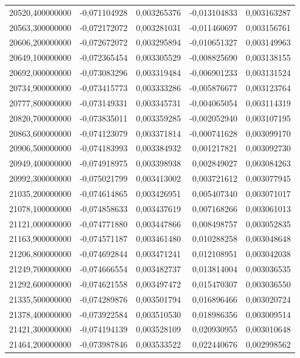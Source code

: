 \begin{longtable}{rrrrr}
20520,400000000 & -0,071104928 & 0,003265376 & -0,013104833 & 0,003163287\\
20563,300000000 & -0,072172072 & 0,003281031 & -0,011460697 & 0,003156761\\
20606,200000000 & -0,072672072 & 0,003295894 & -0,010651327 & 0,003149963\\
20649,100000000 & -0,072365454 & 0,003305529 & -0,008825690 & 0,003138155\\
20692,000000000 & -0,073083296 & 0,003319484 & -0,006901233 & 0,003131524\\
20734,900000000 & -0,073415773 & 0,003333286 & -0,005876677 & 0,003123764\\
20777,800000000 & -0,073149331 & 0,003345731 & -0,004065054 & 0,003114319\\
20820,700000000 & -0,073835011 & 0,003359285 & -0,002052940 & 0,003107195\\
20863,600000000 & -0,074123079 & 0,003371814 & -0,000741628 & 0,003099170\\
20906,500000000 & -0,074183993 & 0,003384932 & 0,001217821 & 0,003092730\\
20949,400000000 & -0,074918975 & 0,003398938 & 0,002849027 & 0,003084263\\
20992,300000000 & -0,075021799 & 0,003413002 & 0,003721612 & 0,003077945\\
21035,200000000 & -0,074614865 & 0,003426951 & 0,005407340 & 0,003071017\\
21078,100000000 & -0,074858633 & 0,003437619 & 0,007168266 & 0,003061013\\
21121,000000000 & -0,074771880 & 0,003447866 & 0,008498757 & 0,003052835\\
21163,900000000 & -0,074571187 & 0,003461480 & 0,010288258 & 0,003048648\\
21206,800000000 & -0,074692844 & 0,003471241 & 0,012108951 & 0,003042038\\
21249,700000000 & -0,074666554 & 0,003482737 & 0,013814004 & 0,003036535\\
21292,600000000 & -0,074621558 & 0,003497472 & 0,015470307 & 0,003036550\\
21335,500000000 & -0,074289876 & 0,003501794 & 0,016896466 & 0,003020724\\
21378,400000000 & -0,073922584 & 0,003510530 & 0,018986356 & 0,003009514\\
21421,300000000 & -0,074194139 & 0,003528109 & 0,020930955 & 0,003010648\\
21464,200000000 & -0,073987846 & 0,003533522 & 0,022440676 & 0,002998562\\

\end{longtable}
